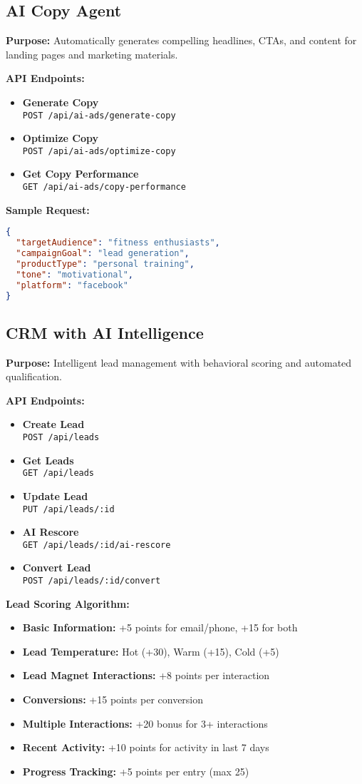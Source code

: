 \documentclass[12pt,a4paper]{article}
\newcommand{\apiendpoint}[2]{\textbf{#1} \\ \texttt{#2}}
\newcommand{\samplecode}[1]{\begin{lstlisting}[language=JSON]#1\end{lstlisting}}
\begin{document}
\subsection{AI Copy Agent}
\textbf{Purpose:} Automatically generates compelling headlines, CTAs, and content for landing pages and marketing materials.

\textbf{API Endpoints:}
\begin{itemize}
    \item \apiendpoint{Generate Copy}{POST /api/ai-ads/generate-copy}
    \item \apiendpoint{Optimize Copy}{POST /api/ai-ads/optimize-copy}
    \item \apiendpoint{Get Copy Performance}{GET /api/ai-ads/copy-performance}
\end{itemize}

\textbf{Sample Request:}
\samplecode{
{
  "targetAudience": "fitness enthusiasts",
  "campaignGoal": "lead generation",
  "productType": "personal training",
  "tone": "motivational",
  "platform": "facebook"
}
}

\subsection{CRM with AI Intelligence}
\textbf{Purpose:} Intelligent lead management with behavioral scoring and automated qualification.

\textbf{API Endpoints:}
\begin{itemize}
    \item \apiendpoint{Create Lead}{POST /api/leads}
    \item \apiendpoint{Get Leads}{GET /api/leads}
    \item \apiendpoint{Update Lead}{PUT /api/leads/:id}
    \item \apiendpoint{AI Rescore}{GET /api/leads/:id/ai-rescore}
    \item \apiendpoint{Convert Lead}{POST /api/leads/:id/convert}
\end{itemize}

\textbf{Lead Scoring Algorithm:}
\begin{itemize}
    \item \textbf{Basic Information:} +5 points for email/phone, +15 for both
    \item \textbf{Lead Temperature:} Hot (+30), Warm (+15), Cold (+5)
    \item \textbf{Lead Magnet Interactions:} +8 points per interaction
    \item \textbf{Conversions:} +15 points per conversion
    \item \textbf{Multiple Interactions:} +20 bonus for 3+ interactions
    \item \textbf{Recent Activity:} +10 points for activity in last 7 days
    \item \textbf{Progress Tracking:} +5 points per entry (max 25)
\end{itemize}
\end{document}
